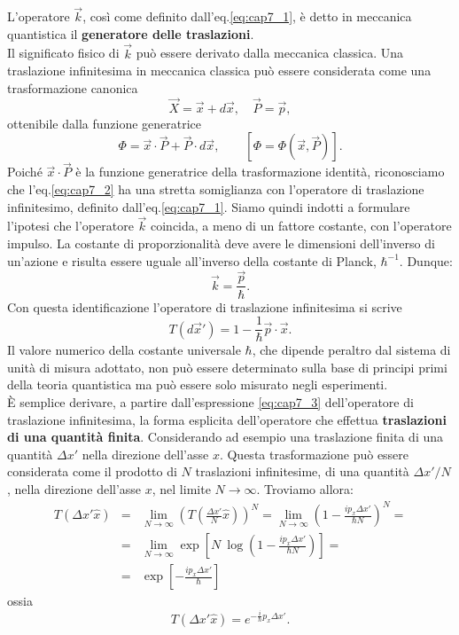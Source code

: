 \documentclass[a4paper,12pt,oneside]{book}
\begin{document}
L'operatore $\vec{k}$, così come definito dall'eq.\eqref{eq:cap7_1}, è detto in meccanica quantistica il \textbf{generatore delle traslazioni}.\\
Il significato fisico di $\vec{k}$ può essere derivato dalla meccanica classica. Una traslazione infinitesima in meccanica classica può essere considerata come una trasformazione canonica
\begin{equation}
\vec{X}= \vec{x}+ d\vec{x}, \quad \vec{P}= \vec{p} ,
\end{equation}
ottenibile dalla funzione generatrice
\begin{equation}
\label{eq:cap7_2}
\Phi = \vec{x}\cdot \vec{P}+\vec{P}\cdot d\vec{x} ,\qquad\left[\Phi=\Phi ( \vec{x}, \vec{P} ) \right].
\end{equation}
Poiché $\vec{x} \cdot \vec{P}$ è la funzione generatrice della trasformazione identità, riconosciamo che l'eq.\eqref{eq:cap7_2} ha una stretta somiglianza con l'operatore di traslazione infinitesimo, definito dall'eq.\eqref{eq:cap7_1}. Siamo quindi indotti a  formulare l'ipotesi che l'operatore $\vec{k}$ coincida, a meno di un fattore costante, con l'operatore impulso. La costante di proporzionalità deve avere le dimensioni dell'inverso di un'azione e risulta essere uguale all'inverso della costante di Planck, $\hbar ^{-1}$. Dunque:
\begin{equation}
\vec{k}=\frac{\vec{p}}{\hbar}.
\end{equation}
Con questa identificazione l'operatore di traslazione infinitesima si scrive
\begin{equation}
\label{eq:cap7_3}
T(d\vec{x}') = 1-\frac{1}{\hbar}\vec{p}\cdot\vec{x}.
\end{equation}
Il valore numerico della costante universale $\hbar$, che dipende peraltro dal sistema di unità di misura adottato, non può essere determinato sulla base di principi primi della teoria quantistica ma può essere solo misurato negli esperimenti. \\
È semplice derivare, a partire dall'espressione \eqref{eq:cap7_3} dell'operatore di traslazione infinitesima, la forma esplicita dell'operatore che effettua \textbf{traslazioni di una quantità finita}. Considerando ad esempio una traslazione finita di una quantità $\Delta x '$ nella direzione dell'asse $x$. Questa trasformazione può essere considerata come il prodotto di $N$ traslazioni infinitesime, di una quantità $\Delta x ' / N$, nella direzione dell'asse $x$, nel limite $N\rightarrow \infty $. Troviamo allora:
\begin{eqnarray}
T(\Delta x'\hat{x}) & = & \lim _{N\rightarrow \infty} \left(T \left( \frac{\Delta x'}{N}\hat{x} \right) \right) ^N = \lim _{N\rightarrow \infty} \left( 1- \frac{i p_x \Delta x'}{\hbar N} \right) ^N =\nonumber \\
&=& \lim _{N\rightarrow \infty} \exp \left[N\ \log \left(1- \frac{i p_x \Delta x'}{\hbar N}  \right) \right] = \nonumber \\
&=& \exp \left[  -\frac{i p_x \Delta x'}{\hbar}  \right] 
\end{eqnarray}
ossia
\begin{equation}
T(\Delta x'\hat{x}) = e^{-\frac{i}{\hbar} p_x \Delta x' }.
\end{equation}
\end{document}

